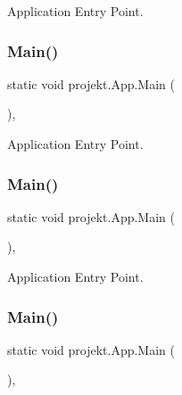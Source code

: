 Application Entry Point. 

\mbox{\label{classprojekt_1_1_app_aa099f0b6d877e4097ec4cbc0f99826ae}} 
\subsubsection{\texorpdfstring{Main()}{Main()}\hspace{0.1cm}{\footnotesize\ttfamily [3/9]}}
{\footnotesize\ttfamily static void projekt.\+App.\+Main (\begin{DoxyParamCaption}{ }\end{DoxyParamCaption})\hspace{0.3cm}{\ttfamily [inline]}, {\ttfamily [static]}}



Application Entry Point. 

\mbox{\label{classprojekt_1_1_app_aa099f0b6d877e4097ec4cbc0f99826ae}} 
\subsubsection{\texorpdfstring{Main()}{Main()}\hspace{0.1cm}{\footnotesize\ttfamily [4/9]}}
{\footnotesize\ttfamily static void projekt.\+App.\+Main (\begin{DoxyParamCaption}{ }\end{DoxyParamCaption})\hspace{0.3cm}{\ttfamily [inline]}, {\ttfamily [static]}}



Application Entry Point. 

\mbox{\label{classprojekt_1_1_app_aa099f0b6d877e4097ec4cbc0f99826ae}} 
\subsubsection{\texorpdfstring{Main()}{Main()}\hspace{0.1cm}{\footnotesize\ttfamily [5/9]}}
{\footnotesize\ttfamily static void projekt.\+App.\+Main (\begin{DoxyParamCaption}{ }\end{DoxyParamCaption})\hspace{0.3cm}{\ttfamily [inline]}, {\ttfamily [static]}}



